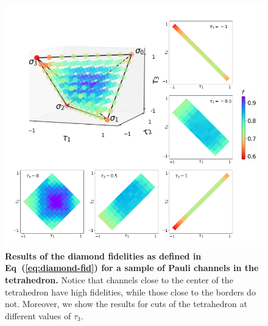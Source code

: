 \documentclass[10pt,letterpaper]{article} %
\newcommand{\eref}[1]{Eq~(\ref{#1})}
\providecommand{\DIFaddbeginFL}{} %
\providecommand{\DIFaddendFL}{} %
\newcommand{\DIFaddincludegraphics}[2][]{{\color{blue}\fbox{\DIFOincludegraphics[#1]{#2}}}} %
\DeclareRobustCommand{\DIFaddbeginFL}{\DIFOaddbeginFL \let\includegraphics\DIFaddincludegraphics} %
\DeclareRobustCommand{\DIFaddendFL}{\DIFOaddendFL \let\includegraphics\DIFOincludegraphics} %
\begin{document}
\begin{figure} %
\centering
\DIFaddbeginFL \includegraphics{fig-tetra.pdf}
\DIFaddendFL \caption{{\bf Results of the diamond fidelities as defined in \eref{eq:diamond-fid}
for a sample of Pauli channels in the tetrahedron.}  Notice that channels close
to the center of the tetrahedron have high fidelities, while those close to the
borders do not.  Moreover, we show the results for cuts of the tetrahedron at
different values of $\tau_3$.}
\label{Fig3}
\end{figure} %
\end{document}
